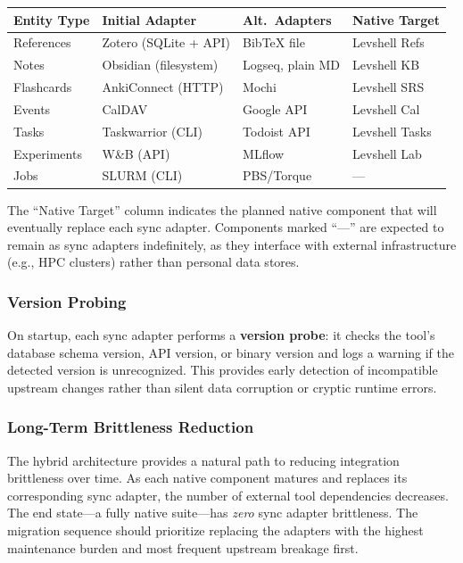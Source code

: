 \documentclass[11pt,a4paper]{article}
\begin{document}
\begin{longtable}{p{3.8cm} p{3.5cm} p{3.5cm} p{2.7cm}}
\toprule
\textbf{Entity Type} & \textbf{Initial Adapter} & \textbf{Alt.\ Adapters} & \textbf{Native Target} \\
\midrule
References & Zotero (SQLite + API) & BibTeX file & Levshell Refs \\
Notes & Obsidian (filesystem) & Logseq, plain MD & Levshell KB \\
Flashcards & AnkiConnect (HTTP) & Mochi & Levshell SRS \\
Events & CalDAV & Google API & Levshell Cal \\
Tasks & Taskwarrior (CLI) & Todoist API & Levshell Tasks \\
Experiments & W\&B (API) & MLflow & Levshell Lab \\
Jobs & SLURM (CLI) & PBS/Torque & --- \\
\bottomrule
\end{longtable}

The ``Native Target'' column indicates the planned native component that will eventually replace each sync adapter. Components marked ``---'' are expected to remain as sync adapters indefinitely, as they interface with external infrastructure (e.g., HPC clusters) rather than personal data stores.

\subsubsection{Version Probing}

On startup, each sync adapter performs a \textbf{version probe}: it checks the tool's database schema version, API version, or binary version and logs a warning if the detected version is unrecognized. This provides early detection of incompatible upstream changes rather than silent data corruption or cryptic runtime errors.

\subsubsection{Long-Term Brittleness Reduction}

The hybrid architecture provides a natural path to reducing integration brittleness over time. As each native component matures and replaces its corresponding sync adapter, the number of external tool dependencies decreases. The end state---a fully native suite---has \emph{zero} sync adapter brittleness. The migration sequence should prioritize replacing the adapters with the highest maintenance burden and most frequent upstream breakage first.
\end{document}
